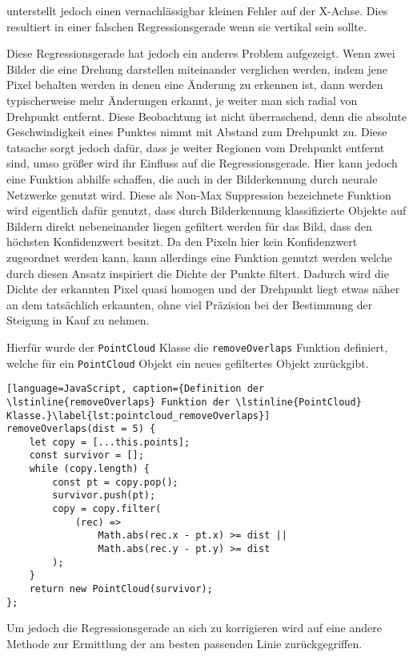 unterstellt jedoch einen vernachlässigbar kleinen Fehler auf der X-Achse.
Dies resultiert in einer falschen Regressionsgerade wenn sie vertikal sein sollte.

Diese Regressionsgerade hat jedoch ein anderes Problem aufgezeigt.
Wenn zwei Bilder die eine Drehung darstellen miteinander verglichen werden, indem jene Pixel behalten werden in denen eine Änderung zu erkennen ist, dann werden typischerweise mehr Änderungen erkannt, je weiter man sich radial von Drehpunkt entfernt.
Diese Beobachtung ist nicht überraschend, denn die absolute Geschwindigkeit eines Punktes nimmt mit Abstand zum Drehpunkt zu.
Diese tatsache sorgt jedoch dafür, dass je weiter Regionen vom Drehpunkt entfernt sind, umso größer wird ihr Einfluss auf die Regressionsgerade.
Hier kann jedoch eine Funktion abhilfe schaffen, die auch in der Bilderkennung durch neurale Netzwerke genutzt wird.
Diese als Non-Max Suppression %
bezeichnete Funktion wird eigentlich dafür genutzt, dass durch Bilderkennung klassifizierte Objekte auf Bildern direkt nebeneinander liegen gefiltert werden für das Bild, dass den höchsten Konfidenzwert besitzt.
Da den Pixeln hier kein Konfidenzwert zugeordnet werden kann, kann allerdings eine Funktion genutzt werden welche durch diesen Ansatz inspiriert die Dichte der Punkte filtert.
Dadurch wird die Dichte der erkannten Pixel quasi homogen und der Drehpunkt liegt etwas näher an dem tatsächlich erkannten, ohne viel Präzision bei der Bestimmung der Steigung in Kauf zu nehmen.

Hierfür wurde der \lstinline{PointCloud} Klasse die \lstinline{removeOverlaps} Funktion definiert, welche für ein \lstinline{PointCloud} Objekt ein neues gefiltertes Objekt zurückgibt.

\begin{lstlisting}[language=JavaScript, caption={Definition der \lstinline{removeOverlaps} Funktion der \lstinline{PointCloud} Klasse.}\label{lst:pointcloud_removeOverlaps}]
removeOverlaps(dist = 5) {
    let copy = [...this.points];
    const survivor = [];
    while (copy.length) {
        const pt = copy.pop();
        survivor.push(pt);
        copy = copy.filter(
            (rec) =>
                Math.abs(rec.x - pt.x) >= dist ||
                Math.abs(rec.y - pt.y) >= dist
        );
    }
    return new PointCloud(survivor);
};
\end{lstlisting}

Um jedoch die Regressionsgerade an sich zu korrigieren wird auf eine andere Methode zur Ermittlung der am besten passenden Linie zurückgegriffen.

